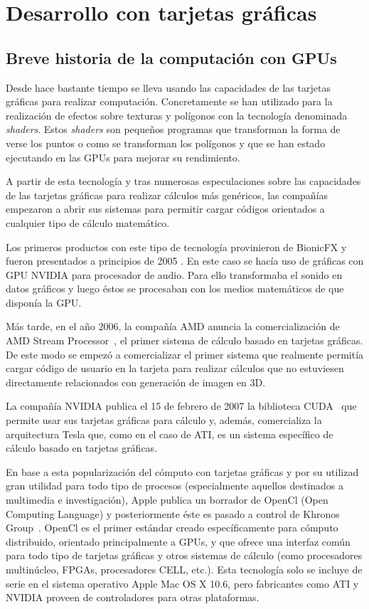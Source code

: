 \chapter{Desarrollo con tarjetas gráficas}\label{cap3}

\section{Breve historia de la computación con GPUs}

Desde hace bastante tiempo se lleva usando las capacidades de las tarjetas gráficas para realizar computación. Concretamente se han utilizado para la realización de efectos sobre texturas y polígonos con la tecnología denominada \emph{shaders}. Estos \emph{shaders} son pequeños programas que transforman la forma de verse los puntos o como se transforman los polígonos y que se han estado ejecutando en las GPUs para mejorar su rendimiento.

A partir de esta tecnología y tras numerosas especulaciones sobre las capacidades de las tarjetas gráficas para realizar cálculos más genéricos, las compañías empezaron a abrir sus sistemas para permitir cargar códigos orientados a cualquier tipo de cálculo matemático.

Los primeros productos con este tipo de tecnología provinieron de BionicFX y fueron presentados a principios de 2005 \cite{website:extremetech_gpu_audio}. En este caso se hacía uso de gráficas con GPU NVIDIA para procesador de audio. Para ello transformaba el sonido en datos gráficos y luego éstos se procesaban con los medios matemáticos de que disponía la GPU.

Más tarde, en el año 2006, la compañía AMD anuncia la comercialización de AMD Stream Processor~\cite{website:amd_press_stream}, el primer sistema de cálculo basado en tarjetas gráficas. De este modo se empezó a comercializar el primer sistema que realmente permitía cargar código de usuario en la tarjeta para realizar cálculos que no estuviesen directamente relacionados con generación de imagen en 3D.

La compañía NVIDIA publica el 15 de febrero de 2007 la biblioteca CUDA~\cite{website:nvidia_press_cuda} que permite usar sus tarjetas gráficas para cálculo y, además, comercializa la arquitectura Tesla que, como en el caso de ATI, es un sistema específico de cálculo basado en tarjetas gráficas.

En base a esta popularización del cómputo con tarjetas gráficas y por  su utilizad gran utilidad para todo tipo de procesos (especialmente aquellos destinados a multimedia e investigación), Apple publica un borrador de OpenCl (Open Computing Language) y posteriormente éste es pasado a control de Khronos Group~\cite{website:khronos_press_opencl}. OpenCl es  el primer estándar creado específicamente para cómputo distribuido, orientado principalmente a GPUs, y que ofrece una interfaz común para todo tipo de tarjetas gráficas y otros sistemas de cálculo (como procesadores multinúcleo, FPGAs, procesadores CELL, etc.). Esta tecnología solo se incluye de serie en el sistema operativo Apple Mac OS X 10.6, pero fabricantes como ATI y NVIDIA proveen de controladores para otras plataformas.


